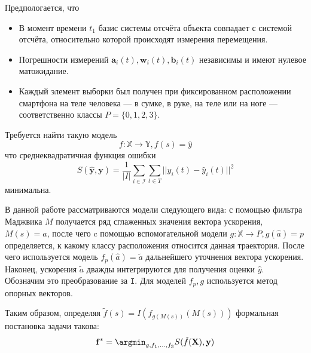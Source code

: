 \documentclass[12pt,twoside]{article}
\begin{document}
Предпологается, что
\begin{itemize}
    \item В момент времени $t_1$ базис системы отсчёта объекта совпадает с системой отсчёта, относительно которой происходят измерения перемещения.
    \item Погрешности измерений $\mathbf{a}_i(t), \mathbf{w}_i(t), \mathbf{b}_i(t)$ независимы и имеют нулевое матожидание.
    \item Каждый элемент выборки был получен при фиксированном расположении смартфона на теле человека --- в сумке, в руке, на теле или на ноге 
    --- соответственно классы $ P = \{0, 1, 2, 3 \} $.
\end{itemize}

Требуется найти такую модель 
$$ 
f: \mathbb{X} \rightarrow \mathbb{Y}, f(s) = \hat{y} 
$$
что среднеквадратичная функция ошибки 
$$
    S(\hat{\mathbf{y}}, \mathbf{y}) = \frac{1}{|I|} \sum\limits_{i \in \mathcal{I}} \sum\limits_{t \in T} || y_i(t) - \hat{y}_i(t) ||^2
$$ 
минимальна.

В данной работе рассматриваются модели следующего вида:
с помощью фильтра Маджвика $M$ получается ряд сглаженных значения вектора ускорения, $M(s) = \hat{a} $, после чего c помощью вспомогательной
модели $g: \mathbb{X} \rightarrow P, g(\hat{a}) = p$ определяется, к какому классу расположения относится данная траектория. После чего
используется модель $f_p(\hat{a}) = \tilde{a} $ дальнейшего уточнения вектора ускорения. Наконец, ускорения $\tilde{a}$ дважды интегрируются для 
получения оценки $\hat{y}$. Обозначим это преобразование за $\mathtt{I}$. Для моделей $f_p, g$ используется метод опорных векторов.

Таким образом, определяя $\tilde{f}(s) = I(f_{g(M(s))}(M(s)))$ формальная постановка задачи такова:
$$
    \mathbf{f}^* = \argmin_{g, f_1, \ldots, f_3 } S(\tilde{f}(\mathbf{X}), \mathbf{y})
$$
\end{document}
